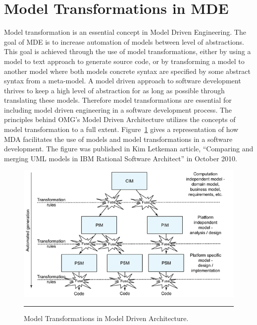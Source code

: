 \section{Model Transformations in MDE}

Model transformation is an essential concept in Model Driven Engineering.
The goal of MDE is to increase automation of models between level of
abstractions. This goal is achieved through the use of model transformations,
either by using a model to text approach to generate source code, or by
transforming a model to another model where both models concrete syntax are
specified by some abstract syntax from a meta-model. A model driven
approach to software development thrives to keep a high level of abstraction
for as long as possible through translating these models. Therefore model
transformations are essential for including model driven engineering in
a software development process. The principles behind OMG's Model Driven
Architecture utilizes the concepts of model transformation to a full extent.
Figure~\ref{fig:MDE_MDA_MT} gives a representation of how MDA 
facilitates the use of models and model transformations in a software
development. The figure was published in Kim Letkeman article, ``Comparing and
merging UML models in IBM Rational Software
Architect''\cite{letkeman2005comparing} in October 2010.

\begin{figure}[H]
  \centering
    \includegraphics[scale=0.8]{./Figures/MDA_MDE.png}
    \rule{35em}{0.5pt}
  \caption[Model Transformations in MDA]
  				{Model Transformations in Model Driven Architecture.}
  \label{fig:MDE_MDA_MT}
\end{figure}

